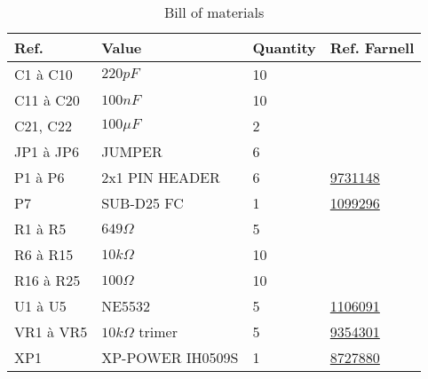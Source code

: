 \begin{en}
\begin{table}[h]
\centering
        \begin{tabular}{|l|l|l|l|}
            \hline 
            Ref. & Value & Quantity & Ref. Farnell \\
            \hline
            C1 à C10 & $220\unit{pF}$ & 10 & \\
            \hline 
            C11 à C20 & $100\unit{nF}$ & 10 & \\
            \hline 
            C21, C22 & $100\unit{\mu F}$ & 2 & \\
            \hline  
            JP1 à JP6 & JUMPER & 6 & \\
            \hline 
            P1 à P6 & 2x1 PIN HEADER & 6 & \href{http://fr.farnell.com/jsp/search/productdetail.jsp?sku=9731148}{9731148}\\
            \hline 
            P7 & SUB-D25 FC & 1 & \href{http://fr.farnell.com/jsp/search/productdetail.jsp?sku=1099296}{1099296}\\
	        \hline    
            R1 à R5 & $649\unit{\Omega}$ & 5 & \\
            \hline
            R6 à R15 & $10\unit{k\Omega}$ & 10 & \\
            \hline 
            R16 à R25 & $100\unit{\Omega}$ & 10 & \\ 
            \hline 
            U1 à U5 & NE5532 & 5 & \href{http://fr.farnell.com/jsp/search/productdetail.jsp?sku=1106091}{1106091}\\
            \hline 
            VR1 à VR5 & $10\unit{k\Omega}$ trimer & 5 & \href{http://fr.farnell.com/jsp/search/productdetail.jsp?sku=9354301}{9354301}\\
            \hline 
            XP1 & XP-POWER IH0509S & 1 & \href{http://fr.farnell.com/jsp/search/productdetail.jsp?sku=8727880}{8727880}\\
            \hline
        \end{tabular}
    \caption{\label{tab:comp_list} Bill of materials}
    \end{table}
\end{en}